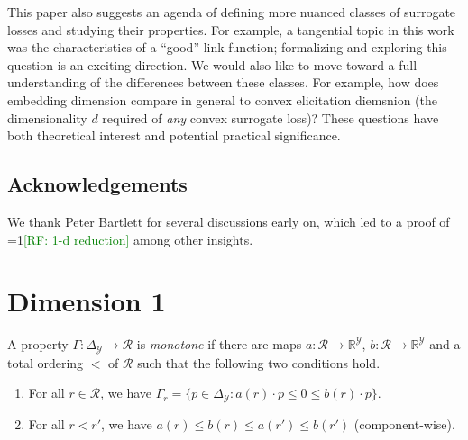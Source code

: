 \documentclass[11pt]{colt2019}
\newcommand{\Comments}{1}
\newcommand{\mynote}[2]{\ifnum\Comments=1\textcolor{#1}{#2}\fi}
\newcommand{\raf}[1]{\mynote{green}{[RF: #1]}}
\newcommand{\reals}{\mathbb{R}}
\newcommand{\simplex}{\Delta_\Y}
\newcommand{\R}{\mathcal{R}}
\newcommand{\Y}{\mathcal{Y}}
\begin{document}
This paper also suggests an agenda of defining more nuanced classes of surrogate losses and studying their properties.
For example, a tangential topic in this work was the characteristics of a ``good'' link function; formalizing and exploring this question is an exciting direction.
We would also like to move toward a full understanding of the differences between these classes.
For example, how does embedding dimension compare in general to convex elicitation diemsnion (the dimensionality $d$ required of \emph{any} convex surrogate loss)?
These questions have both theoretical interest and potential practical significance.

\subsection*{Acknowledgements}
We thank Peter Bartlett for several discussions early on, which led to a proof of \raf{1-d reduction} among other insights.



\appendix

\section{Dimension 1}\label{app:dimension-1}

\begin{definition}
  A property $\Gamma:\simplex\to\R$ is \emph{monotone} if there are maps $a:\R\to\reals^\Y$, $b:\R\to\reals^\Y$ and a total ordering $<$ of $\R$ such that the following two conditions hold.
  \begin{enumerate}
  \item For all $r\in\R$, we have $\Gamma_r = \{p\in\simplex : a(r) \cdot p \leq 0 \leq b(r) \cdot p\}$.
  \item For all $r < r'$, we have $a(r) \leq b(r) \leq a(r') \leq b(r')$ (component-wise).
  \end{enumerate}
\end{definition}
\end{document}
